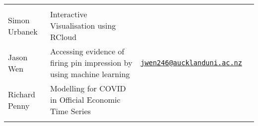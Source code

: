 \documentclass[
]{book}
\begin{document}
\begin{longtable}[]{@{}llll@{}}
\begin{minipage}[t]{0.22\columnwidth}
\strut
\end{minipage} & \begin{minipage}[t]{0.22\columnwidth}\raggedright
\strut
\end{minipage}\tabularnewline
\begin{minipage}[t]{0.22\columnwidth}\raggedright
Simon Urbanek\strut
\end{minipage} & \begin{minipage}[t]{0.22\columnwidth}\raggedright
Interactive Visualisation using RCloud\strut
\end{minipage} & \begin{minipage}[t]{0.22\columnwidth}\raggedright
\strut
\end{minipage} & \begin{minipage}[t]{0.22\columnwidth}\raggedright
\strut
\end{minipage}\tabularnewline
\begin{minipage}[t]{0.22\columnwidth}\raggedright
Jason Wen\strut
\end{minipage} & \begin{minipage}[t]{0.22\columnwidth}\raggedright
Accessing evidence of firing pin impression by using machine learning\strut
\end{minipage} & \begin{minipage}[t]{0.22\columnwidth}\raggedright
\href{mailto:jwen246@aucklanduni.ac.nz}{\nolinkurl{jwen246@aucklanduni.ac.nz}}\strut
\end{minipage} & \begin{minipage}[t]{0.22\columnwidth}\raggedright
\strut
\end{minipage}\tabularnewline
\begin{minipage}[t]{0.22\columnwidth}\raggedright
Richard Penny\strut
\end{minipage} & \begin{minipage}[t]{0.22\columnwidth}\raggedright
Modelling for COVID in Official Economic Time Series\strut
\end{minipage} & \begin{minipage}[t]{0.22\columnwidth}\raggedright
\strut
\end{minipage} & \begin{minipage}[t]{0.22\columnwidth}\raggedright
\strut
\end{minipage}\tabularnewline
\begin{minipage}[t]{0.22\columnwidth}\raggedright
\strut
\end{minipage} & \begin{minipage}[t]{0.22\columnwidth}\raggedright

\end{minipage}
\end{longtable}
\end{document}
